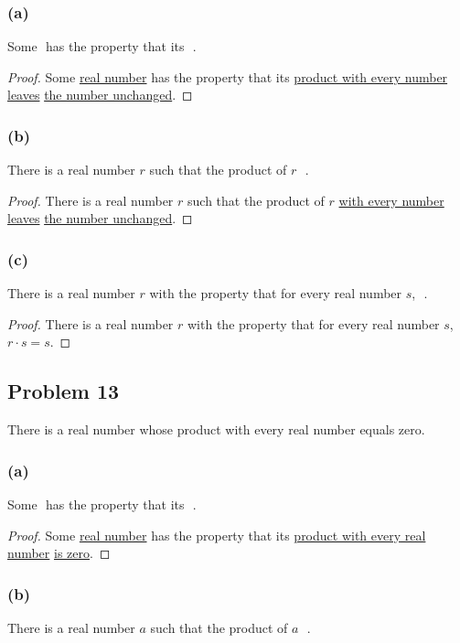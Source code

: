 \documentclass[14pt]{extarticle}
\newcommand{\fbl}{\underline{\hspace{1cm}}\,\,}
\begin{document}
\subsubsection{(a)}
Some \fbl has the property that its \fbl.

\begin{proof}
Some \underline{real number} has the property that its \underline{product with
every number leaves} \underline{the number unchanged}.
\end{proof}

\subsubsection{(b)}
There is a real number $r$ such that the product of $r$ \fbl.

\begin{proof}
There is a real number $r$ such that the product of $r$ \underline{with every
number leaves} \underline{the number unchanged}.
\end{proof}

\subsubsection{(c)}
There is a real number $r$ with the property that for every real number $s$,
\fbl.

\begin{proof}
There is a real number $r$ with the property that for every real number $s$,
\underline{$r \cdot s = s$}.
\end{proof}

\subsection{Problem 13}
There is a real number whose product with every real number equals zero.

\subsubsection{(a)}
Some \fbl has the property that its \fbl.

\begin{proof}
Some \underline{real number} has the property that its \underline{product with
every real number} \underline{is zero}.
\end{proof}

\subsubsection{(b)}
There is a real number $a$ such that the product of $a$ \fbl.
\end{document}
